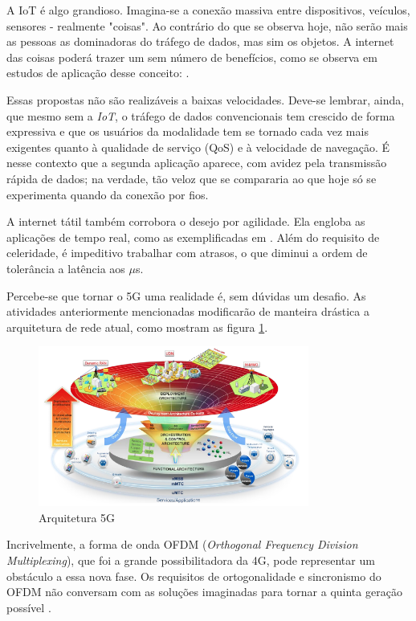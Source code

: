 A IoT é algo grandioso. Imagina-se a conexão massiva entre dispositivos, veículos, sensores - realmente "coisas". Ao contrário do que se observa hoje, não serão mais as pessoas as dominadoras do tráfego de dados, mas sim os objetos. A internet das coisas poderá trazer um sem número de benefícios, como se observa em estudos de aplicação desse conceito: \cite{Prouski} \cite{Saha} \cite{Hlaing}. 
\par Essas propostas não são realizáveis a baixas velocidades. Deve-se lembrar, ainda, que mesmo sem a \textit{IoT}, o tráfego de dados convencionais tem crescido de forma expressiva e que os usuários da modalidade tem se tornado cada vez mais exigentes quanto à qualidade de serviço (QoS) e à velocidade de navegação. É nesse contexto que a segunda aplicação aparece, com avidez pela transmissão rápida de dados; na verdade, tão veloz que se compararia ao que hoje só se experimenta quando da conexão por fios. 
\par A internet tátil também corrobora o desejo por agilidade. Ela engloba as aplicações de tempo real, como as exemplificadas em \cite{Fettweis1}. Além do requisito de celeridade, é impeditivo trabalhar com atrasos, o que diminui a ordem de tolerância a latência aos $\mu$s. 
\par Percebe-se que tornar o 5G uma realidade é, sem dúvidas um desafio. As atividades anteriormente mencionadas modificarão de manteira drástica a arquitetura de rede atual, como mostram as figura \ref{Figura_arquitetura_atual}. 

\begin{figure}[h!]
\centering
\includegraphics[width=3.5in]{Figura_arquitetura}
\caption{Arquitetura 5G \cite{MetisD28}}
\label{Figura_arquitetura_atual}
\end{figure}

Incrivelmente, a forma de onda OFDM (\textit{Orthogonal Frequency Division Multiplexing}), que foi a grande possibilitadora da 4G, pode representar um obstáculo a essa nova fase. Os requisitos de ortogonalidade e sincronismo do OFDM não conversam com as soluções imaginadas para tornar a quinta geração possível \cite{Wunder}. 

